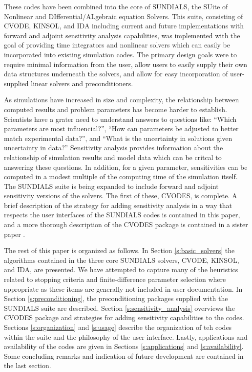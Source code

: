 These codes have been combined into the core of SUNDIALS, the  
SUite of Nonlinear and DIfferential/ALgebraic equation Solvers.  
This suite, consisting of CVODE, KINSOL, and IDA including current 
and future implementations with forward and adjoint sensitivity 
analysis capabilities, was implemented with the goal of providing
time integrators and nonlinear solvers which can easily be 
incorporated into existing simulation codes.  The primary design 
goals were to require minimal information from the user, allow users 
to easily supply their own data structures underneath the solvers, 
and allow for easy incorporation of user-supplied linear solvers
and preconditioners.

As simulations have increased in size and complexity, the 
relationship between computed results and problem parameters has 
become harder to establish.  Scientists have a grater need to
understand answers to questions like: ``Which parameters are 
most influencial?'', ``How can parameters be adjusted to better 
match experimental data?'', and ``What is the uncertainty in solutions 
given uncertainty in data?''  Sensitivity analysis provides 
information about the relationship of simulation results and model data 
 which can be critcal to answering these questions.  In addition, for 
a given parameter, sensitivities can be computed in a modest multiple of 
the computing time of the simulation itself.  
The SUNDIALS suite is being expanded to 
include forward and adjoint sensitivity versions of the solvers.
The first of these, CVODES, is complete.  A brief description of the
strategy for adding sensitivity analysis in a way that respects the
user interfaces of the SUNDIALS codes is contained in this paper, and 
a more thorough description of the CVODES package is contained in a sister 
paper \cite{SeHi:03}.

The rest of this paper is organized as follows.  In Section 
\ref{s:basic_solvers} the algorithms contained in the three 
core SUNDIALS solvers, CVODE, KINSOL, and IDA, are presented.  
We have attempted to capture many of the heuristics related to 
stopping criteria and finite-difference parameter selection
where appropriate as these items are generally not included in 
user documentation.  In Section \ref{s:preconditioning}, the
preconditioning packages supplied with the SUNDIALS suite are
described.  Section \ref{s:sensitivity_analysis} overviews
the CVODES package and strategies for adding sensitivity 
capabilities to the codes.  Sections \ref{s:organization} and 
\ref{s:usage} describe the organization of teh codes within the 
suite and the philosophy of the user interface.  Lastly, 
applications and availability of the codes are given in 
Sections \ref{s:applications} and \ref{s:availability}.  Some
concluding remarks and indication of future development
are contained in the last section.



